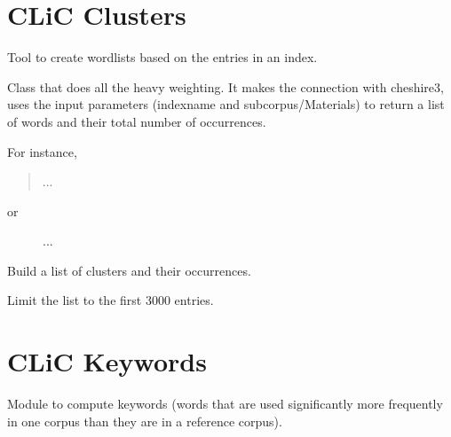 \documentclass[letterpaper,10pt,english]{sphinxmanual}
\begin{document}
\section{CLiC Clusters}
\label{apidoc:clic-clusters}\label{apidoc:module-clusters}
Tool to create wordlists based on the entries in an index.

\begin{fulllineitems}
\label{apidoc:clusters.Clusters}
Class that does all the heavy weighting. It makes the connection with
cheshire3, uses the input parameters (indexname and subcorpus/Materials) to
return a list of words and their total number of occurrences.

For instance,
\begin{quote}



...
\end{quote}
\begin{description}
\item[{or}] \leavevmode
{}


...

\end{description}

\begin{fulllineitems}
\label{apidoc:clusters.Clusters.list_clusters}
Build a list of clusters and their occurrences.

Limit the list to the first 3000 entries.

\end{fulllineitems}


\end{fulllineitems}



\section{CLiC Keywords}
\label{apidoc:module-keywords}\label{apidoc:clic-keywords}
Module to compute keywords (words that are used significantly more frequently
in one corpus than they are in a reference corpus).
\end{document}
